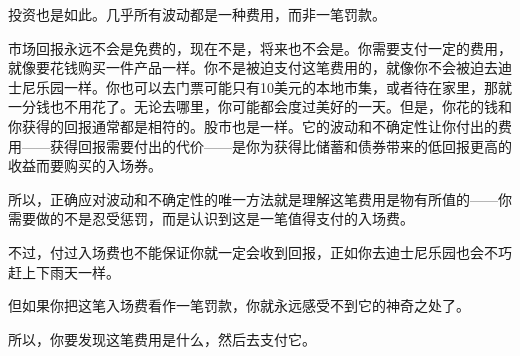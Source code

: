 投资也是如此。几乎所有波动都是一种费用，而非一笔罚款。

市场回报永远不会是免费的，现在不是，将来也不会是。你需要支付一定的费用，就像要花钱购买一件产品一样。你不是被迫支付这笔费用的，就像你不会被迫去迪士尼乐园一样。你也可以去门票可能只有10美元的本地市集，或者待在家里，那就一分钱也不用花了。无论去哪里，你可能都会度过美好的一天。但是，你花的钱和你获得的回报通常都是相符的。股市也是一样。它的波动和不确定性让你付出的费用——获得回报需要付出的代价——是你为获得比储蓄和债券带来的低回报更高的收益而要购买的入场券。

所以，正确应对波动和不确定性的唯一方法就是理解这笔费用是物有所值的——你需要做的不是忍受惩罚，而是认识到这是一笔值得支付的入场费。

不过，付过入场费也不能保证你就一定会收到回报，正如你去迪士尼乐园也会不巧赶上下雨天一样。

但如果你把这笔入场费看作一笔罚款，你就永远感受不到它的神奇之处了。

所以，你要发现这笔费用是什么，然后去支付它。
